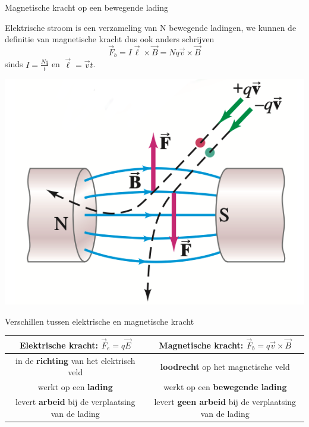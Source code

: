 \begin{theo}{Magnetische kracht op een bewegende lading}
    \vspace{-0.5cm}
    \begin{minipage}{0.67\textwidth}
        Elektrische stroom is een verzameling van N bewegende ladingen, we kunnen de definitie van magnetische kracht dus ook anders schrijven
        \begin{equation*}
            \Vec{F}_b = I\Vec{\ell} \times \Vec{B} = Nq\Vec{v} \times \Vec{B}
        \end{equation*}
        sinds $I = \tfrac{Nq}{t}$ en $\Vec{\ell} = \Vec{v}t$. 
    \end{minipage}
    \hspace{0.2cm}\begin{minipage}{.26\textwidth}
        \vspace{-0.2cm}\includegraphics[scale=0.23]{Images/Magnetisme/MagnetischeKrachtOpBewgendeLading}
    \end{minipage}
    \vspace{-0.3cm}
\end{theo}

\begin{vrg}{Verschillen tussen elektrische en magnetische kracht}
    \vspace{-0.3cm}
    \def\arraystretch{2}
    \hspace{-0.35cm}
    \begin{tabular}{c|c}
        Elektrische kracht: $\Vec{F}_e = q\Vec{E}$ & Magnetische kracht: $\Vec{F}_b = q\Vec{v} \times \Vec{B}$ \\ \hline
        in de \textbf{richting} van het elektrisch veld & \textbf{loodrecht} op het magnetische veld \\
        werkt op een \textbf{lading} & werkt op een \textbf{bewegende lading} \\
        levert \textbf{arbeid} bij de verplaatsing van de lading & levert \textbf{geen arbeid} bij de verplaatsing van de lading \\
    \end{tabular}
\end{vrg}

